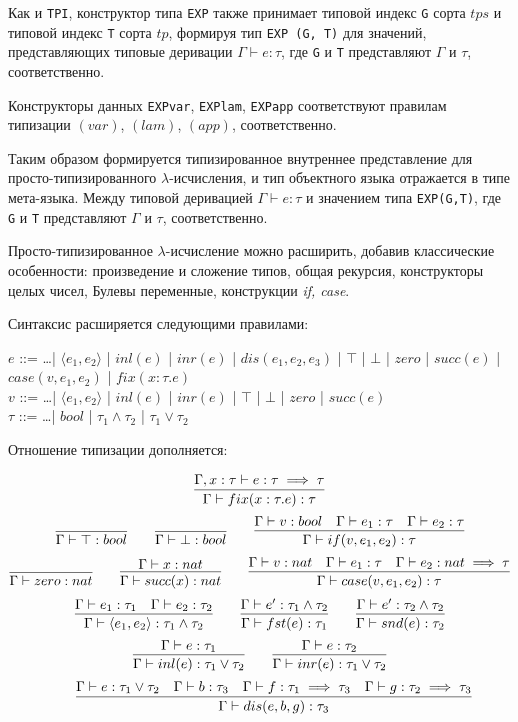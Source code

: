 Как и \lstinline!TPI!, конструктор типа \lstinline!EXP! также принимает типовой индекс \lstinline!G! сорта $tps$ и типовой индекс \lstinline!T! сорта $tp$, формируя тип \lstinline!EXP (G, T)! для значений, представляющих типовые деривации $\Gamma \vdash e:\tau$, где \lstinline!G! и \lstinline!T! представляют $\Gamma$ и  $\tau$, соответственно.

Конструкторы данных \lstinline!EXPvar!, \lstinline!EXPlam!, \lstinline!EXPapp! соответствуют правилам типизации $(var)$, $(lam)$, $(app)$, соответственно.

Таким образом формируется типизированное внутреннее представление для просто-типизированного $\lambda$-исчисления, и тип объектного языка отражается в типе мета-языка. Между типовой деривацией $\Gamma \vdash e:\tau$ и значением типа \lstinline!EXP(G,T)!, где \lstinline!G! и \lstinline!T! представляют $\Gamma$ и $\tau$, соответственно.

Просто-типизированное $\lambda$-исчисление можно расширить, добавив классические особенности: произведение и сложение типов, общая рекурсия, конструкторы целых чисел, Булевы переменные, конструкции \emph{if, case}.

Синтаксис расширяется следующими правилами:
\begin{center}
$e$ ::= \ldots | $\langle e_1, e_2 \rangle$
  | $inl(e)$ | $inr(e)$ | $dis(e_1,e_2,e_3)$ | $\top$ | $\bot$
  | $zero$ | $succ(e)$ | $case(v,e_1,e_2)$
  | $fix (x:\tau . e)$ \\
$v$ ::= \ldots | $\langle e_1, e_2 \rangle$
  | $inl(e)$ | $inr(e)$ | $\top$ | $\bot$
  | $zero$ | $succ(e)$ \\
$\tau$ ::= \ldots | $bool$ | $\tau_1 \land \tau_2$ | $\tau_1 \lor \tau_2$
\end{center}

Отношение типизации дополняется:

$$
\infer{\Gamma \vdash fix (x:\tau . e):\tau}
  {\Gamma, x:\tau \vdash e:\tau \implies \tau}
$$
$$
\infer{\Gamma \vdash \top: bool}{}
\qquad \infer{\Gamma \vdash \bot: bool}{}
\qquad \infer{\Gamma \vdash if(v, e_1, e_2): \tau}
  {\Gamma \vdash v: bool & \Gamma \vdash e_1:\tau & \Gamma \vdash e_2:\tau}
$$
$$
\infer{\Gamma \vdash zero: nat}{}
\qquad \infer{\Gamma \vdash succ(x):nat}{\Gamma \vdash x:nat}
\qquad \infer{\Gamma \vdash case(v, e_1, e_2):\tau}
  {\Gamma \vdash v: nat & \Gamma \vdash e_1:\tau
  & \Gamma \vdash e_2:nat \implies \tau}
$$
$$
\infer
  {\Gamma \vdash \langle e_1, e_2 \rangle : \tau_1 \land \tau_2}
  {\Gamma \vdash e_1 : \tau_1 & \Gamma \vdash e_2 : \tau_2}
\qquad \infer
  {\Gamma \vdash fst(e):\tau_1}{\Gamma \vdash e': \tau_1 \land \tau_2}
\qquad \infer
  {\Gamma \vdash snd(e):\tau_2}{\Gamma \vdash e': \tau_2 \land \tau_2}
$$
$$
\infer{\Gamma \vdash inl(e):\tau_1 \lor \tau_2}{\Gamma \vdash e:\tau_1}
\qquad \infer{\Gamma \vdash inr(e):\tau_1 \lor \tau_2}
  {\Gamma \vdash e:\tau_2}
$$
$$
\qquad \infer{\Gamma \vdash dis(e,b,g):\tau_3}
  {\Gamma \vdash e:\tau_1 \lor \tau_2
  &\Gamma \vdash b:\tau_3 & \Gamma \vdash f:\tau_1 \implies \tau_3
  &\Gamma \vdash g:\tau_2 \implies \tau_3}
$$

